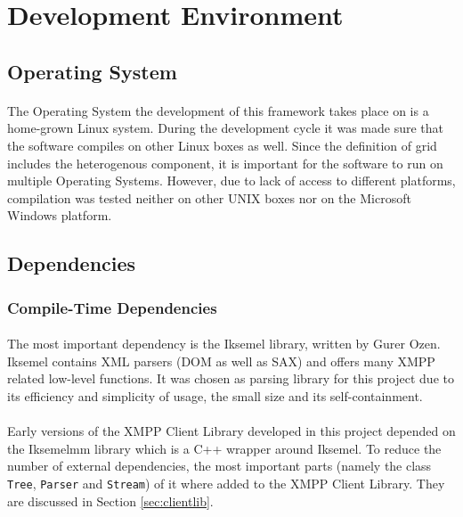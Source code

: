 \section{Development Environment}

\subsection{Operating System}
\paragraph{}
The Operating System the development of this framework takes place on is a home-grown Linux system. During the development cycle it was made sure that the software compiles on other Linux boxes as well. Since the definition of grid includes the heterogenous component, it is important for the software to run on multiple Operating Systems. However, due to lack of access to different platforms, compilation was tested neither on other UNIX boxes nor on the Microsoft Windows platform.

\subsection{Dependencies}
\label{sec:depend}

\subsubsection{Compile-Time Dependencies}
\label{sec:compdepend}
\paragraph{}
The most important dependency is the Iksemel library, written by Gurer Ozen. Iksemel contains XML parsers (DOM as well as SAX) and offers many XMPP related low-level functions. It was chosen as parsing library for this project due to its efficiency and simplicity of usage, the small size and its self-containment.

\paragraph{}
Early versions of the XMPP Client Library developed in this project depended on the Iksemelmm library which is a C++ wrapper around Iksemel. To reduce the number of external dependencies, the most important parts (namely the class \texttt{Tree}, \texttt{Parser} and \texttt{Stream}) of it where added to the XMPP Client Library. They are discussed in Section \ref{sec:clientlib}.


